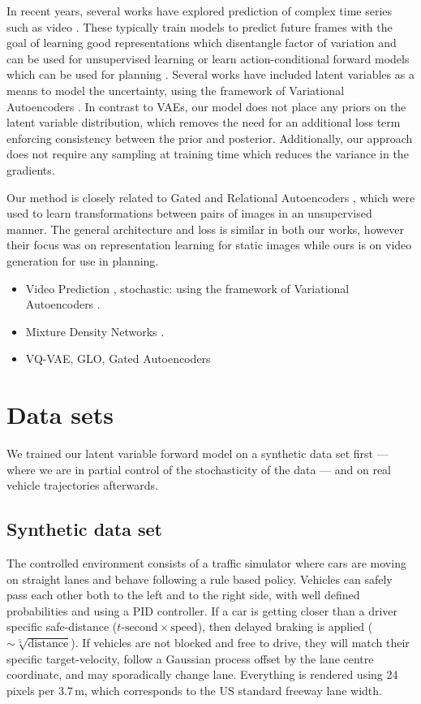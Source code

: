 \documentclass{article}
\begin{document}
In recent years, several works have explored prediction of complex time series such as video \citep{mathieu-iclr-2016,canziani2017cortexnet}.
These typically train models to predict future frames with the goal of learning good representations which disentangle factor of variation and can be used for unsupervised learning \citep{Srivastava15, Villegas17, DentonB17} or learn action-conditional forward models which can be used for planning \citep{Oh15, FinnGL16, Poke, VideoPixel}.
Several works have included latent variables as a means to model the uncertainty, using the framework of Variational Autoencoders \citep{Babaeizadeh2018, Denton2018}.
In contrast to VAEs, our model does not place any priors on the latent variable distribution, which removes the need for an additional loss term enforcing consistency between the prior and posterior.
Additionally, our approach does not require any sampling at training time which reduces the variance in the gradients.

Our method is closely related to Gated and Relational Autoencoders \citep{RelationalAE, GAE}, which were used to learn transformations between pairs of images in an unsupervised manner.
The general architecture and loss is similar in both our works, however their focus was on representation learning for static images while ours is on video generation for use in planning.

\begin{itemize}
\item Video Prediction \citep{mathieu-iclr-2016}, stochastic:  using the framework of Variational Autoencoders \citep{VAE}.
\item Mixture Density Networks \citep{mixture-density-networks}.
\item VQ-VAE, GLO, Gated Autoencoders
\end{itemize}


\section{Data sets}
We trained our latent variable forward model on a synthetic data set first --- where we are in partial control of the stochasticity of the data --- and on real vehicle trajectories afterwards.

\subsection{Synthetic data set}
The controlled environment consists of a traffic simulator where cars are moving on straight lanes and behave following a rule based policy.
Vehicles can safely pass each other both to the left and to the right side, with well defined probabilities and using a PID controller.
If a car is getting closer than a driver specific safe-distance ($t\text{-second} \times \text{speed}$), then delayed braking is applied ($\sim \sqrt[5]{\text{distance}}$).
If vehicles are not blocked and free to drive, they will match their specific target-velocity, follow a Gaussian process offset by the lane centre coordinate, and may sporadically change lane.
Everything is rendered using 24 pixels per $3.7\,\text{m}$, which corresponds to the US standard freeway lane width.
\end{document}
